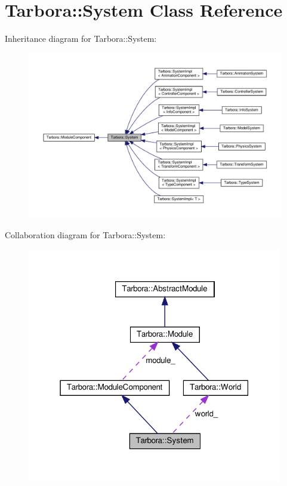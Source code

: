 \hypertarget{classTarbora_1_1System}{}\section{Tarbora\+:\+:System Class Reference}
\label{classTarbora_1_1System}


Inheritance diagram for Tarbora\+:\+:System\+:\nopagebreak
\begin{figure}[H]
\begin{center}
\leavevmode
\includegraphics[width=350pt]{classTarbora_1_1System__inherit__graph}
\end{center}
\end{figure}


Collaboration diagram for Tarbora\+:\+:System\+:\nopagebreak
\begin{figure}[H]
\begin{center}
\leavevmode
\includegraphics[width=316pt]{classTarbora_1_1System__coll__graph}
\end{center}
\end{figure}
